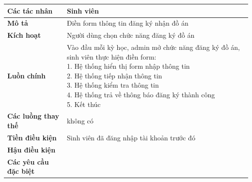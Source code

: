 \begin{tabular}{|l|l|}
	\hline
	\textbf{Các tác nhân}       & Sinh viên                                                                                         \\
	\hline
	\textbf{Mô tả}              & Điền form thông tin đăng ký nhận đồ án                                                            \\
	\hline
	\textbf{Kích hoạt}          & Người dùng chọn chức năng đăng ký đồ án                                                           \\
	\hline
	\textbf{Luồn chính}         & \makecell[l]{Vào đầu mỗi kỳ học, admin mở chức năng đăng ký đồ án, sinh viên thực hiện điền form: \\ 1. Hệ thống hiển thị form nhập thông tin \\ 2. Hệ thống tiếp nhận thông tin \\ 3. Hệ thống kiểm tra thông tin \\ 4. Hệ thống trả về thông báo đăng ký thành công \\ 5. Kết thúc} \\
	\hline
	\textbf{Các luồng thay thế} & không có                                                                                                 \\
	\hline
	\textbf{Tiền điều kiện}     & Sinh viên đã đăng nhập tài khoản trước đó                                                                                                 \\
	\hline
	\textbf{Hậu điều kiện}      &                                                                                                   \\
	\hline
  \textbf{Các yêu cầu đặc biệt} & \\
  \hline
\end{tabular}

